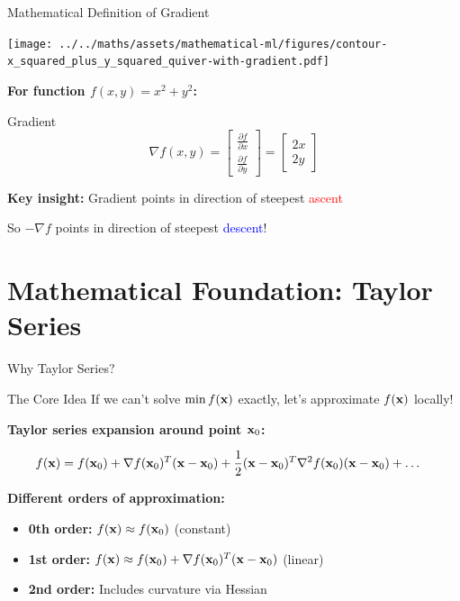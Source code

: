 \documentclass[usenames,dvipsnames]{beamer}
\begin{document}
  \begin{frame}{Mathematical Definition of Gradient}
    \begin{center}
    \texttt{[image: ../../maths/assets/mathematical-ml/figures/contour-x\_squared\_plus\_y\_squared\_quiver-with-gradient.pdf]}
    \end{center}
    
    \textbf{For function $f(x, y) = x^2 + y^2$:}
    
    \pause
    \begin{definitionbox}{Gradient}
    $$\nabla f(x, y) = \begin{bmatrix} \frac{\partial f}{\partial x} \\ \frac{\partial f}{\partial y} \end{bmatrix} = \begin{bmatrix} 2x \\ 2y \end{bmatrix}$$
    \end{definitionbox}
    
    \pause
    \begin{keypointsbox}
    \textbf{Key insight:} Gradient points in direction of steepest \textcolor{red}{ascent}
    
    So $-\nabla f$ points in direction of steepest \textcolor{blue}{descent}!
    \end{keypointsbox}
  \end{frame}

  \section{Mathematical Foundation: Taylor Series}

  \begin{frame}{Why Taylor Series?}
    \begin{examplebox}{The Core Idea}
    If we can't solve $\min f(\mathbf{x})$ exactly, let's approximate $f(\mathbf{x})$ locally!
    \end{examplebox}
    
    \pause
    \textbf{Taylor series expansion around point $\mathbf{x}_0$:}
    
    \begin{align}
        f(\mathbf{x}) &= f(\mathbf{x}_0) + \nabla f(\mathbf{x}_0)^T(\mathbf{x}-\mathbf{x}_0) + \frac{1}{2}(\mathbf{x}-\mathbf{x}_0)^T\nabla^2 f(\mathbf{x}_0)(\mathbf{x}-\mathbf{x}_0) + \ldots
    \end{align}
    
    \pause
    \textbf{Different orders of approximation:}
    \begin{itemize}[<+->]
        \item \textbf{0th order:} $f(\mathbf{x}) \approx f(\mathbf{x}_0)$ (constant)
        \item \textbf{1st order:} $f(\mathbf{x}) \approx f(\mathbf{x}_0) + \nabla f(\mathbf{x}_0)^T(\mathbf{x}-\mathbf{x}_0)$ (linear)
        \item \textbf{2nd order:} Includes curvature via Hessian
    \end{itemize}
  \end{frame}
\end{document}
